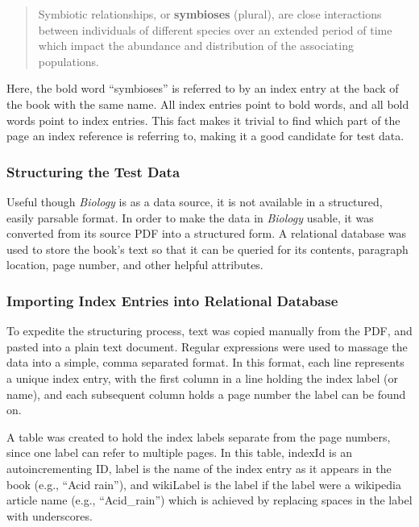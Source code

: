\begin{quote}
Symbiotic relationships, or {\bf symbioses} (plural), are close interactions between individuals of different species over an extended period of time which impact the abundance and distribution of the associating populations.~\cite{biology}
\end{quote}

\noindent Here, the bold word ``symbioses'' is referred to by an index entry at the back of the book with the same name. All index entries point to bold words, and all bold words point to index entries. This fact makes it trivial to find which part of the page an index reference is referring to, making it a good candidate for test data.

\subsubsection{Structuring the Test Data}

Useful though {\it Biology} is as a data source, it is not available in a structured, easily parsable format.
In order to make the data in {\it Biology} usable, it was converted from its source PDF into a structured form.
A relational database was used to store the book's text so that it can be queried for its contents, paragraph location, page number, and other helpful attributes.

\subsubsection{Importing Index Entries into Relational Database}

To expedite the structuring process, text was copied manually from the PDF, and pasted into a plain text document.
Regular expressions were used to massage the data into a simple, comma separated format.
In this format, each line represents a unique index entry, with the first column in a line holding the index label (or name), and each subsequent column holds a page number the label can be found on.

A table was created to hold the index labels separate from the page numbers, since one label can refer to multiple pages.
In this table, indexId is an autoincrementing ID, label is the name of the index entry as it appears in the book (e.g., ``Acid rain''), and wikiLabel is the label if the label were a wikipedia article name (e.g., ``Acid\_rain'') which is achieved by replacing spaces in the label with underscores.


